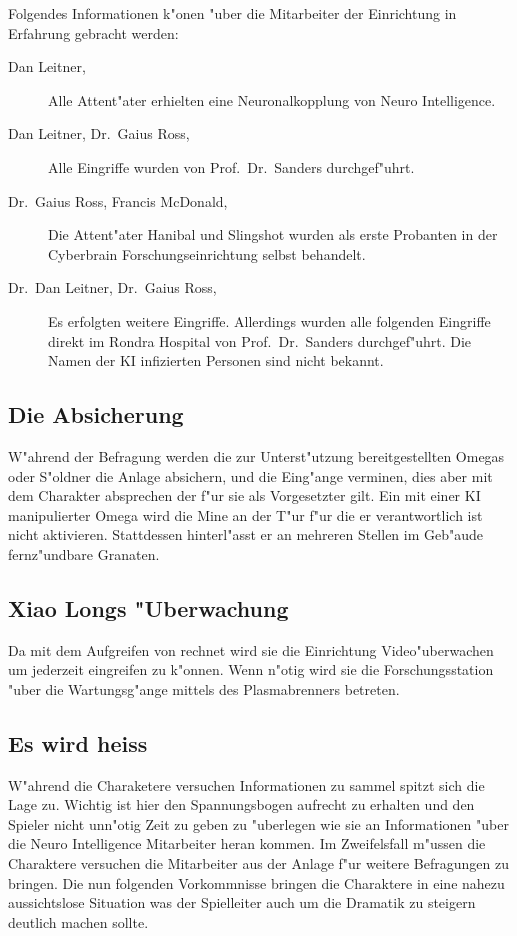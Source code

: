 Folgendes Informationen k"onen "uber die Mitarbeiter der Einrichtung in Erfahrung gebracht werden:

\begin{description}
	\item[Dan Leitner, \ml{}] Alle Attent"ater erhielten eine Neuronalkopplung von Neuro Intelligence.
	\item[Dan Leitner, Dr.~Gaius Ross, \ml{}] Alle Eingriffe wurden von Prof.~Dr.~Sanders durchgef"uhrt.
	\item[Dr.~Gaius Ross, Francis McDonald, \ml{}] Die Attent"ater Hanibal und Slingshot wurden als erste Probanten in der Cyberbrain 			Forschungseinrichtung selbst behandelt.	
	\item[Dr.~Dan Leitner, Dr.~Gaius Ross, \ml{}] Es erfolgten weitere Eingriffe. Allerdings wurden alle folgenden Eingriffe direkt im 			Rondra Hospital von Prof.~Dr.~Sanders durchgef"uhrt. Die Namen der KI infizierten Personen sind nicht bekannt.
\end{description}

\subsection{Die Absicherung} 
W"ahrend der Befragung werden die zur Unterst"utzung bereitgestellten Omegas oder S"oldner die Anlage absichern, und die Eing"ange verminen, dies aber mit dem Charakter absprechen der f"ur sie als Vorgesetzter gilt. Ein mit einer KI manipulierter Omega wird die Mine an der T"ur f"ur die er verantwortlich ist nicht aktivieren. Stattdessen hinterl"asst er an mehreren Stellen im Geb"aude fernz"undbare Granaten.

\subsection{Xiao Longs "Uberwachung}  
Da \xl{} mit dem Aufgreifen von \ml{} rechnet wird sie die Einrichtung Video"uberwachen um jederzeit eingreifen zu k"onnen. Wenn n"otig wird sie die Forschungsstation "uber die Wartungsg"ange mittels des Plasmabrenners betreten.

\subsection{Es wird heiss} 
W"ahrend die Charaketere versuchen Informationen zu sammel spitzt sich die Lage zu. Wichtig ist hier den Spannungsbogen aufrecht zu erhalten und den Spieler nicht unn"otig Zeit zu geben zu "uberlegen wie sie an Informationen "uber die Neuro Intelligence Mitarbeiter heran kommen. Im Zweifelsfall m"ussen die Charaktere versuchen die Mitarbeiter aus der Anlage f"ur weitere Befragungen zu bringen. Die nun folgenden Vorkommnisse bringen die Charaktere in eine nahezu aussichtslose Situation was der Spielleiter auch um die Dramatik zu steigern deutlich machen sollte.

